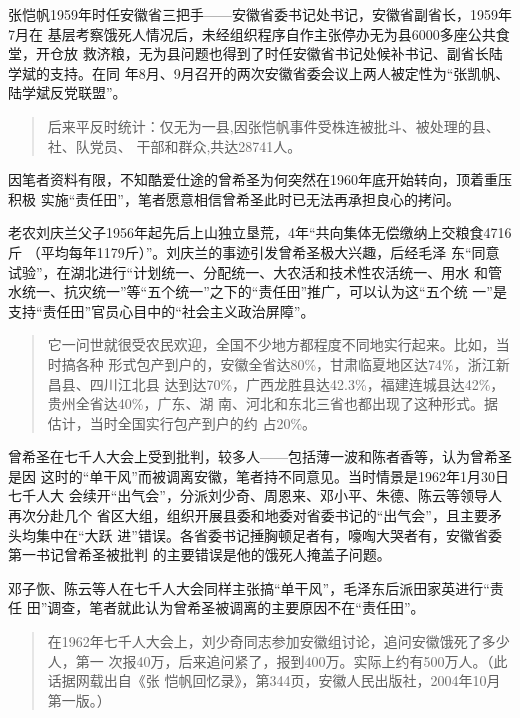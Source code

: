 张恺帆1959年时任安徽省三把手——安徽省委书记处书记，安徽省副省长，1959年7月在
基层考察饿死人情况后，未经组织程序自作主张停办无为县6000多座公共食堂，开仓放
救济粮，无为县问题也得到了时任安徽省书记处候补书记、副省长陆学斌的支持。在同
年8月、9月召开的两次安徽省委会议上两人被定性为“张凯帆、陆学斌反党联盟”。
\begin{quotation}
  后来平反时统计：仅无为一县,因张恺帆事件受株连被批斗、被处理的县、社、队党员、
  干部和群众,共达28741人。\cite{zhang1959}
\end{quotation}

因笔者资料有限，不知酷爱仕途的曾希圣为何突然在1960年底开始转向，顶着重压积极
实施“责任田”，笔者愿意相信曾希圣此时已无法再承担良心的拷问。

老农刘庆兰父子1956年起先后上山独立垦荒，4年“共向集体无偿缴纳上交粮食4716斤
（平均每年1179斤）”。\cite{anhuiliushi}刘庆兰的事迹引发曾希圣极大兴趣，后经毛泽
东“同意试验”，在湖北进行“计划统一、分配统一、大农活和技术性农活统一、用水
和管水统一、抗灾统一”等“五个统一”之下的“责任田”推广，可以认为这“五个统
一”是支持“责任田”官员心目中的“社会主义政治屏障”。

\begin{quotation}
  它一问世就很受农民欢迎，全国不少地方都程度不同地实行起来。比如，当时搞各种
  形式包产到户的，安徽全省达80\%，甘肃临夏地区达74\%，浙江新昌县、四川江北县
  达到达70\%，广西龙胜县达42.3\%，福建连城县达42\%，贵州全省达40\%，广东、湖
  南、河北和东北三省也都出现了这种形式。据估计，当时全国实行包产到户的约
  占20\%。
\end{quotation}

曾希圣在七千人大会上受到批判，较多人——包括薄一波和陈者香等，认为曾希圣是因
这时的“单干风”而被调离安徽，笔者持不同意见。当时情景是1962年1月30日七千人大
会续开“出气会”，分派刘少奇、周恩来、邓小平、朱德、陈云等领导人再次分赴几个
省区大组，组织开展县委和地委对省委书记的“出气会”，且主要矛头均集中在“大跃
进”错误。各省委书记捶胸顿足者有，嚎啕大哭者有，安徽省委第一书记曾希圣被批判
的主要错误是他的饿死人掩盖子问题。

邓子恢、陈云等人在七千人大会同样主张搞“单干风”，毛泽东后派田家英进行“责任
田”调查，笔者就此认为曾希圣被调离的主要原因不在“责任田”。

\begin{quotation}
  在1962年七千人大会上，刘少奇同志参加安徽组讨论，追问安徽饿死了多少人，第一
  次报40万，后来追问紧了，报到400万。实际上约有500万人。（此话据网载出自《张
  恺帆回忆录》，第344页，安徽人民出版社，2004年10月第一版。）
\end{quotation}

